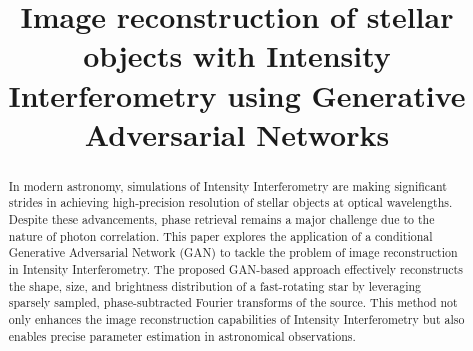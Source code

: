 \documentclass[fleqn,usenatbib,twocolumn]{mnras}
\title{Image reconstruction of stellar objects with Intensity Interferometry using Generative Adversarial Networks}
\date{}
\begin{document}
\maketitle

\begin{abstract}
In modern astronomy, simulations of Intensity Interferometry are making significant strides in achieving high-precision resolution of stellar objects at optical wavelengths. Despite these advancements, phase retrieval remains a major challenge due to the nature of photon correlation. This paper explores the application of a conditional Generative Adversarial Network (GAN) to tackle the problem of image reconstruction in Intensity Interferometry. The proposed GAN-based approach effectively reconstructs the shape, size, and brightness distribution of a fast-rotating star by leveraging sparsely sampled, phase-subtracted Fourier transforms of the source. This method not only enhances the image reconstruction capabilities of Intensity Interferometry but also enables precise parameter estimation in astronomical observations.  
\end{abstract}









\end{document}
